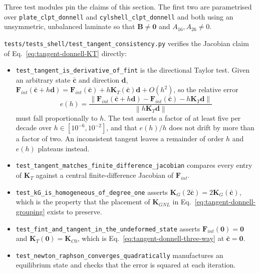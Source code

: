 Three test modules pin the claims of this section. The first two are parametrised over \texttt{plate\_clpt\_donnell} and \texttt{cylshell\_clpt\_donnell} and both using an unsymmetric, unbalanced laminate so that $\boldsymbol{B} \neq \boldsymbol{0}$ and $A_{16}, A_{26} \neq 0$.

\texttt{tests/tests\_shell/test\_tangent\_consistency.py} verifies the Jacobian claim of Eq.~\ref{eq:tangent-donnell-KT} directly:

\begin{itemize}
	\item \texttt{test\_tangent\_is\_derivative\_of\_fint} is the directional Taylor test. Given an arbitrary state $\bar{\boldsymbol{c}}$ and direction $\boldsymbol{d}$, $\boldsymbol{F}_{int}(\bar{\boldsymbol{c}} + h\boldsymbol{d}) = \boldsymbol{F}_{int}(\bar{\boldsymbol{c}}) + h \boldsymbol{K}_T(\bar{\boldsymbol{c}}) \boldsymbol{d} + O(h^2)$, so the relative error
	\begin{equation*}
		e(h) = \frac{\left\| \boldsymbol{F}_{int}(\bar{\boldsymbol{c}} + h\boldsymbol{d}) - \boldsymbol{F}_{int}(\bar{\boldsymbol{c}}) - h \boldsymbol{K}_T \boldsymbol{d} \right\|}{\left\| h \boldsymbol{K}_T \boldsymbol{d} \right\|}
	\end{equation*}
	must fall proportionally to $h$. The test asserts a factor of at least five per decade over $h \in [10^{-6}, 10^{-2}]$, and that $e(h)/h$ does not drift by more than a factor of two. An inconsistent tangent leaves a remainder of order $h$ and $e(h)$ plateaus instead.
	\item \texttt{test\_tangent\_matches\_finite\_difference\_jacobian} compares every entry of $\boldsymbol{K}_T$ against a central finite-difference Jacobian of $\boldsymbol{F}_{int}$.
	\item \texttt{test\_kG\_is\_homogeneous\_of\_degree\_one} asserts $\boldsymbol{K}_G(2\bar{\boldsymbol{c}}) = 2\boldsymbol{K}_G(\bar{\boldsymbol{c}})$, which is the property that the placement of $\boldsymbol{K}_{GNL}$ in Eq.~\ref{eq:tangent-donnell-grouping} exists to preserve.
	\item \texttt{test\_fint\_and\_tangent\_in\_the\_undeformed\_state} asserts $\boldsymbol{F}_{int}(\boldsymbol{0}) = \boldsymbol{0}$ and $\boldsymbol{K}_T(\boldsymbol{0}) = \boldsymbol{K}_{C0}$, which is Eq.~\ref{eq:tangent-donnell-three-way} at $\bar{\boldsymbol{c}} = \boldsymbol{0}$.
	\item \texttt{test\_newton\_raphson\_converges\_quadratically} manufactures an equilibrium state and checks that the error is squared at each iteration.
\end{itemize}

